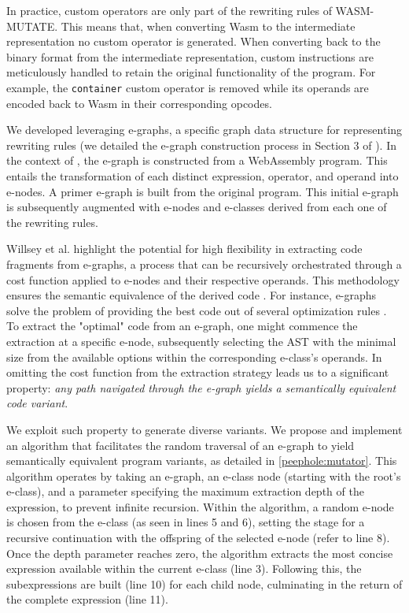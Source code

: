 

In practice, custom operators are only part of the rewriting rules of WASM-MUTATE.
This means that, when converting Wasm to the intermediate representation no custom operator is generated.
When converting back to the \Wasm binary format from the intermediate representation, custom instructions are meticulously handled to retain the original functionality of the \Wasm program. 
For example, the \texttt{container} custom operator is removed while its operands are encoded back to Wasm in their corresponding opcodes.

\label{custom}


We developed \tool leveraging e-graphs, a specific graph data structure for representing rewriting rules \cite{10.1145/3571207} (we detailed the e-graph construction process in Section 3 of \cite{wasmmutate}). 
In the context of \tool, the e-graph is constructed from a WebAssembly program.
This entails the transformation of each distinct expression, operator, and operand into e-nodes. 
A primer e-graph is built from the original program.
This initial e-graph is subsequently augmented with e-nodes and e-classes derived from each one of the rewriting rules.

Willsey et al. highlight the potential for high flexibility in extracting code fragments from e-graphs, a process that can be recursively orchestrated through a cost function applied to e-nodes and their respective operands.
This methodology ensures the semantic equivalence of the derived code \cite{e-graph}. 
For instance, e-graphs solve the problem of providing the best code out of several optimization rules \cite{optimization order problem}.
To extract the "optimal" code from an e-graph, one might commence the extraction at a specific e-node, subsequently selecting the AST with the minimal size from the available options within the corresponding e-class's operands.
In \too omitting the cost function from the extraction strategy leads us to a significant property: \emph{any path navigated through the e-graph yields a semantically equivalent code variant}. 

We exploit such property to generate diverse \Wasm variants.
We propose and implement an algorithm that facilitates the random traversal of an e-graph to yield semantically equivalent program variants, as detailed in \autoref{peephole:mutator}. 
This algorithm operates by taking an e-graph, an e-class node (starting with the root's e-class), and a parameter specifying the maximum extraction depth of the expression, to prevent infinite recursion.
Within the algorithm, a random e-node is chosen from the e-class (as seen in lines 5 and 6), setting the stage for a recursive continuation with the offspring of the selected e-node (refer to line 8). 
Once the depth parameter reaches zero, the algorithm extracts the most concise expression available within the current e-class (line 3). 
Following this, the subexpressions are built (line 10) for each child node, culminating in the return of the complete expression (line 11).


